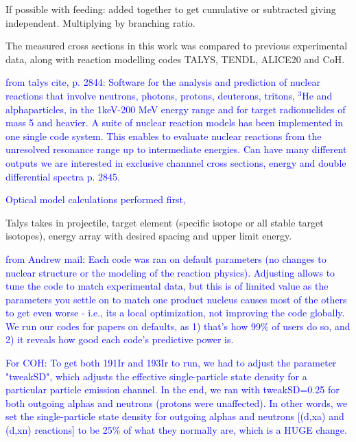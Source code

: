 If possible with feeding: added together to get cumulative or subtracted giving independent. Multiplying by branching ratio. 

The measured cross sections in this work was compared to previous experimental data, along with reaction modelling codes TALYS, TENDL, ALICE20 and CoH. \\

\noindent 
\textcolor{blue}{from talys cite, p. 2844: Software for the analysis and prediction of nuclear reactions that involve neutrons, photons, protons, deuterons, tritons, $^3$He and alphaparticles, in the 1keV-200 MeV energy range and for target radionuclides of mass 5 and heavier. A suite of nuclear reaction models has been implemented in one single code system. This enables to evaluate nuclear reactions from the unresolved resonance range up to intermediate energies. Can have many different outputs we are interested in exclusive channnel cross sections, energy and double differential spectra p. 2845. 

Optical model calculations performed first, }

Talys takes in projectile, target element (specific isotope or all stable target isotopes), energy array with desired spacing and upper limit energy. 

\textcolor{blue}{from Andrew mail: Each code was ran on default parameters (no changes to nuclear structure or the modeling of the reaction physics). Adjusting allows to tune the code to match experimental data, but this is of limited value as the parameters you settle on to match one product nucleus causes most of the others to get even worse - i.e., its a local optimization, not improving the code globally.  We run our codes for papers on defaults, as 1) that's how 99\% of users do so, and 2) it reveals how good each code's predictive power is. 

For COH: To get both 191Ir and 193Ir to run, we had to adjust the parameter "tweakSD", which adjusts the effective single-particle state density for a particular particle emission channel.  In the end, we ran with tweakSD=0.25  for both outgoing alphas and neutrons  (protons were unaffected).  In other words, we set the single-particle state density for outgoing alphas and neutrons [(d,xa) and (d,xn) reactions]  to be 25\% of what they normally are, which is a HUGE change.} 


